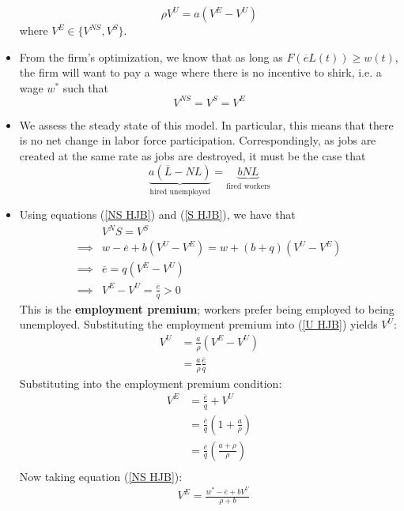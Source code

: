 \documentclass[12pt]{article}
\begin{document}
\begin{itemize}
    \begin{equation}\label{U HJB}
        \rho V^U = a(V^E - V^U)
    \end{equation}
    where $V^E \in \{V^{NS}, V^S\}$.
    \item From the firm's optimization, we know that as long as $F(\overline{e}L(t)) \geq w(t)$, the firm will want to pay a wage where there is no incentive to shirk, i.e. a wage $w^*$ such that
    \[V^{NS} = V^S = V^E\]
    \item We assess the steady state of this model. In particular, this means that there is no net change in labor force participation. Correspondingly, as jobs are created at the same rate as jobs are destroyed, it must be the case that
    \begin{equation}\label{Shapiro Labor SS}
        \underbrace{a(\overline{L} - NL)}_{\text{hired unemployed}} = \underbrace{bNL}_{\text{fired workers}}
    \end{equation}
    \item Using equations (\ref{NS HJB}) and (\ref{S HJB}), we have that
    \[\begin{split}
        &V^NS = V^S \\
        \implies &w-\overline{e} + b(V^U-V^E) = w + (b+q)(V^U-V^E) \\
        \implies &\overline{e} = q(V^E - V^U) \\
        \implies &V^E - V^U = \frac{\overline{e}}{q} > 0
    \end{split}\]
    This is the \textbf{employment premium}; workers prefer being employed to being unemployed. Substituting the employment premium into (\ref{U HJB}) yields $V^U$:
    \[\begin{split}
        V^U &= \frac{a}{\rho}(V^E - V^U) \\
        &= \frac{a}{\rho}\frac{\overline{e}}{q}
    \end{split}\]
    Substituting into the employment premium condition:
    \[\begin{split}
        V^E &= \frac{\overline{e}}{q} + V^U \\
        &= \frac{\overline{e}}{q}\left(1 + \frac{a}{\rho}\right) \\
        &= \frac{\overline{e}}{q}\left(\frac{a + \rho}{\rho}\right) \\
    \end{split}\]
    Now taking equation (\ref{NS HJB}):
    \[\begin{split}
        &V^E = \frac{w^* - \overline{e} + bV^U}{\rho + b} \\

\end{split}\]
\end{itemize}
\end{document}

